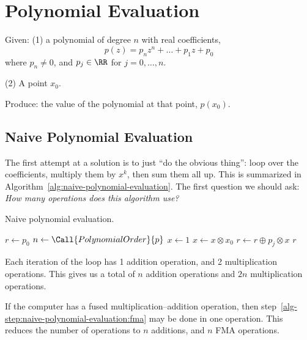\chapter{Polynomial Evaluation}

\begin{problem}
  Given: (1) a polynomial of degree $n$ with real coefficients,
  \begin{equation*}
    p(z) = p_{n}z^{n} + \dots + p_{1}z + p_{0}
  \end{equation*}
  where $p_{n}\neq0$, and $p_{j}\in\RR$ for $j=0,\dots,n$.

  (2) A point $x_{0}$.

  Produce: the value of the polynomial at that point, $p(x_{0})$.
\end{problem}

\section{Naive Polynomial Evaluation}

The first attempt at a solution is to just ``do the obvious thing'':
loop over the coefficients, multiply them by $x^{k}$, then sum them all
up. This is summarized in Algorithm~\ref{alg:naive-polynomial-evaluation}.
The first question we should ask:
\emph{How many operations does this algorithm use?}

\begin{algorithm}\label{alg:naive-polynomial-evaluation}
  \caption{Naive polynomial evaluation.}
  \begin{algorithmic}[1]
     
      \State\label{alg-step:naive-polynomial-evaluation:initial-load} $r\gets p_{0}$
      \State $n\gets\Call{PolynomialOrder}{p}$
      \State $x\gets 1$
        \State $x\gets x\otimes x_{0}$
        \State\label{alg-step:naive-polynomial-evaluation:fma} $r\gets r\oplus p_{j}\otimes x$
      \EndFor
      \State \Return $r$  
    \EndFunction
\end{algorithmic}
\end{algorithm}

Each iteration of the loop has 1 addition operation, and 2
multiplication operations. This gives us a total of $n$ addition
operations and $2n$ multiplication operations.

If the computer has a fused multiplication--addition operation, then
step~\ref{alg-step:naive-polynomial-evaluation:fma} may be done in one
operation. This reduces the number of operations to $n$ additions, and
$n$ FMA operations.

